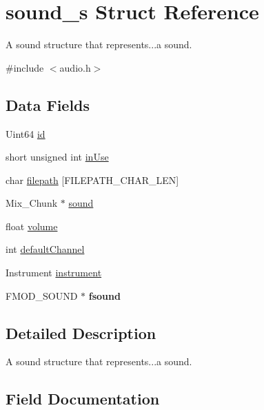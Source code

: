 \hypertarget{structsound__s}{}\section{sound\+\_\+s Struct Reference}
\label{structsound__s}


A sound structure that represents...a sound.  




{\ttfamily \#include $<$audio.\+h$>$}

\subsection*{Data Fields}
\begin{DoxyCompactItemize}
\item 
Uint64 \hyperlink{structsound__s_a4158e9a3af9337e59f9b8de984c0efba}{id}
\item 
short unsigned int \hyperlink{structsound__s_a13159f6b47122dc47eb11b1653a1663a}{in\+Use}
\item 
char \hyperlink{structsound__s_aa860b866620309ee03358dbb835ca4d7}{filepath} \mbox{[}F\+I\+L\+E\+P\+A\+T\+H\+\_\+\+C\+H\+A\+R\+\_\+\+L\+EN\mbox{]}
\item 
Mix\+\_\+\+Chunk $\ast$ \hyperlink{structsound__s_a0bb45d52afdd032f48e17a8519361d54}{sound}
\item 
float \hyperlink{structsound__s_a016abda2855c77dcc1630f9d2f9f8d18}{volume}
\item 
int \hyperlink{structsound__s_a5a158796b730c78bbae975d936e229f0}{default\+Channel}
\item 
Instrument \hyperlink{structsound__s_a88fb6e4086e01e476912df234d0f9d20}{instrument}
\item 
\mbox{\label{structsound__s_ac1072fb2f49995e1342ffcfef83774c4}} 
F\+M\+O\+D\+\_\+\+S\+O\+U\+ND $\ast$ {\bfseries fsound}
\end{DoxyCompactItemize}


\subsection{Detailed Description}
A sound structure that represents...a sound. 

\subsection{Field Documentation}
\mbox{\label{structsound__s_a5a158796b730c78bbae975d936e229f0}} 
